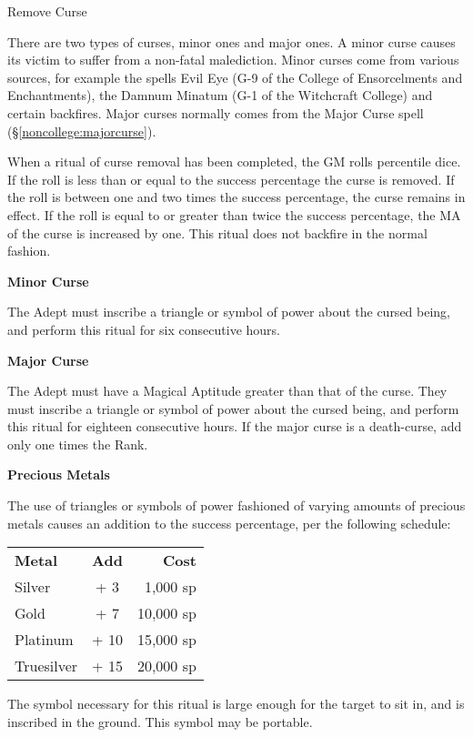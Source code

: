 \begin{multicols}{3}
\begin{ritual}[]{Remove Curse}
\begin{effects}
There are two types of curses, minor ones and major ones.  A minor
curse causes its victim to suffer from a non-fatal malediction.  Minor
curses come from various sources, for example the spells Evil Eye (G-9
of the College of Ensorcelments and Enchantments), the Damnum Minatum
(G-1 of the Witchcraft College) and certain backfires.  Major curses
normally comes from the Major Curse spell (\S \ref{noncollege:majorcurse}).

When a ritual of curse removal has been completed, the GM rolls
percentile dice.  If the roll is less than or equal to the success
percentage the curse is removed. If the roll is between one and two
times the success percentage, the curse remains in effect.  If the
roll is equal to or greater than twice the success percentage, the MA
of the curse is increased by one.  This ritual does not backfire in
the normal fashion.

\textbf{Minor Curse}

The Adept must inscribe a triangle or symbol of power about the cursed
being, and perform this ritual for six consecutive hours.

\textbf{Major Curse}

The Adept must have a Magical Aptitude greater than that of the curse.
They must inscribe a triangle or symbol of power about the cursed
being, and perform this ritual for eighteen consecutive hours.  If the
major curse is a death-curse, add only one times the Rank.

\textbf{Precious Metals}

The use of triangles or symbols of power fashioned of varying amounts
of precious metals causes an addition to the success percentage, per
the following schedule:

\begin{tabularx}{\linewidth}{Xcr}
\textbf{Metal} & \textbf{Add} & \textbf{Cost} \\
Silver      & +  3 &  1,000 sp \\
Gold        & +  7 & 10,000 sp \\
Platinum    & + 10 & 15,000 sp \\
Truesilver  & + 15 & 20,000 sp \\
\end{tabularx}

The symbol necessary for this ritual is large enough for the target to
sit in, and is inscribed in the ground.  This symbol may be portable.
\end{effects}
\end{ritual}

\raggedcolumns
\clearemptydoublepage
\end{multicols}
